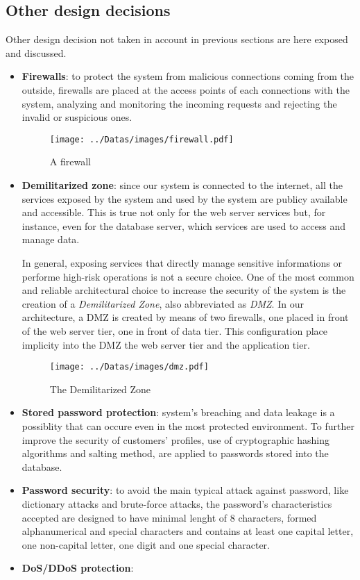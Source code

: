 \subsection{Other design decisions}

\label{sec:other-design-decisions}

Other design decision not taken in account in previous sections are here exposed and discussed.

\begin{itemize}
	\item \textbf{Firewalls}: to protect the system from malicious connections coming from the outside, firewalls are placed at the access points of each connections with the system, analyzing and monitoring the incoming requests and rejecting the invalid or suspicious ones.
\begin{figure}[H]
	\centerline{
		\texttt{[image: ../Datas/images/firewall.pdf]}
	}
	\caption{A firewall}
	\label{fig:firewall}
\end{figure}

	\item \textbf{Demilitarized zone}: since our system is connected to the internet, all the services exposed by the system and used by the system are publicy available and accessible. This is true not only for the web server services but, for instance, even for the database server, which services are used to access and manage data. 

In general, exposing services that directly manage sensitive informations or performe high-risk operations is not a secure choice. One of the most common and reliable architectural choice to increase the security of the system is the creation of a \textit{Demilitarized Zone}, also abbreviated as \textit{DMZ}. In our architecture, a DMZ is created by means of two firewalls, one placed in front of the web server tier, one in front of data tier. This configuration place implicity into the DMZ the web server tier and the application tier.
\begin{figure}[H]
	\centerline{
		\texttt{[image: ../Datas/images/dmz.pdf]}
	}
	\caption{The Demilitarized Zone}
	\label{fig:dmz}
\end{figure}
	\item \textbf{Stored password protection}: system's breaching and data leakage is a possiblity that can occure even in the most protected environment. To further improve the security of customers' profiles, use of cryptographic hashing algorithms and salting method, are applied to passwords stored into the database.
	\item \textbf{Password security}: to avoid the main typical attack against password, like dictionary attacks and brute-force attacks, the password's characteristics accepted are designed to have minimal lenght of 8 characters, formed alphanumerical and special characters and contains at least one capital letter, one non-capital letter, one digit and one special character.
	\item \textbf{DoS/DDoS protection}:
\end{itemize}

